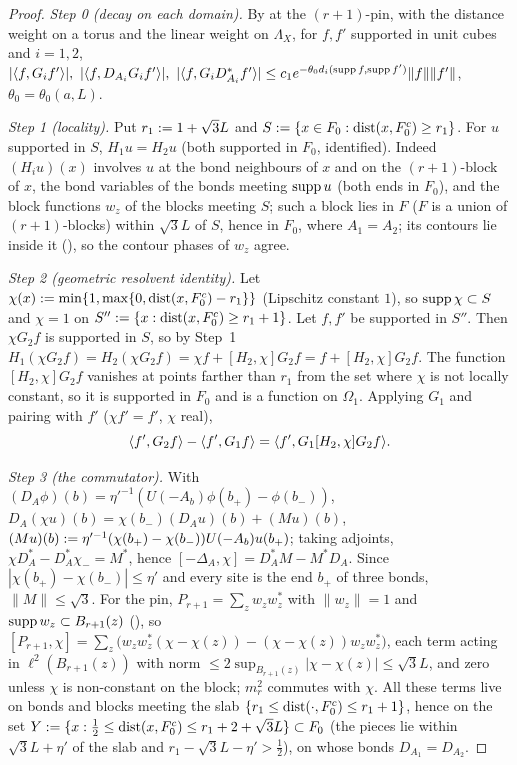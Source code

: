 \begin{proof}
\emph{Step 0 (decay on each domain).} By  at the $(r+1)$-pin, with the distance weight on a torus and the linear weight on $\Lambda_X$, for $f,f'$ supported in unit cubes and $i=1,2$,
$|\langle f,G_if'\rangle|,\ |\langle f,D_{A_i}G_if'\rangle|,\ |\langle f,G_iD_{A_i}^*f'\rangle|\le c_1e^{-\theta_0d_i(\operatorname{supp} f,\operatorname{supp} f')}\|f\|\|f'\|$, $\theta_0=\theta_0(a,L)$.

\emph{Step 1 (locality).} Put $r_1:=1+\sqrt3L$ and $S:=\{x\in F_0:\operatorname{dist}(x,F_0^c)\ge r_1\}$. For $u$ supported in $S$, $H_1u=H_2u$ (both supported in $F_0$, identified). Indeed $(H_iu)(x)$ involves $u$ at the bond neighbours of $x$ and on the $(r+1)$-block of $x$, the bond variables of the bonds meeting $\operatorname{supp} u$ (both ends in $F_0$), and the block functions $w_z$ of the blocks meeting $S$; such a block lies in $F$ ($F$ is a union of $(r+1)$-blocks) within $\sqrt3L$ of $S$, hence in $F_0$, where $A_1=A_2$; its contours lie inside it (), so the contour phases of $w_z$ agree.

\emph{Step 2 (geometric resolvent identity).} Let $\chi(x):=\min\{1,\max\{0,\operatorname{dist}(x,F_0^c)-r_1\}\}$ (Lipschitz constant $1$), so $\operatorname{supp}\chi\subset S$ and $\chi=1$ on $S'':=\{x:\operatorname{dist}(x,F_0^c)\ge r_1+1\}$. Let $f,f'$ be supported in $S''$. Then $\chi G_2f$ is supported in $S$, so by Step~1 $H_1(\chi G_2f)=H_2(\chi G_2f)=\chi f+[H_2,\chi]G_2f=f+[H_2,\chi]G_2f$. The function $[H_2,\chi]G_2f$ vanishes at points farther than $r_1$ from the set where $\chi$ is not locally constant, so it is supported in $F_0$ and is a function on $\Omega_1$. Applying $G_1$ and pairing with $f'$ ($\chi f'=f'$, $\chi$ real),
\begin{equation}\label{rot:hyb:eq:B3}
\langle f',G_2f\rangle-\langle f',G_1f\rangle=\langle f',G_1[H_2,\chi]G_2f\rangle.
\end{equation}

\emph{Step 3 (the commutator).} With $(D_A\phi)(b)=\eta'^{-1}(U(-A_b)\phi(b_+)-\phi(b_-))$, $D_A(\chi u)(b)=\chi(b_-)(D_Au)(b)+(Mu)(b)$, $(Mu)(b):=\eta'^{-1}(\chi(b_+)-\chi(b_-))U(-A_b)u(b_+)$; taking adjoints, $\chi D_A^*-D_A^*\chi_-=M^*$, hence $[-\Delta_A,\chi]=D_A^*M-M^*D_A$. Since $|\chi(b_+)-\chi(b_-)|\le\eta'$ and every site is the end $b_+$ of three bonds, $\|M\|\le\sqrt3$. For the pin, $P_{r+1}=\sum_zw_zw_z^*$ with $\|w_z\|=1$ and $\operatorname{supp} w_z\subset B_{r+1}(z)$ (), so $[P_{r+1},\chi]=\sum_z\big(w_zw_z^*(\chi-\chi(z))-(\chi-\chi(z))w_zw_z^*\big)$, each term acting in $\ell^2(B_{r+1}(z))$ with norm $\le2\sup_{B_{r+1}(z)}|\chi-\chi(z)|\le\sqrt3L$, and zero unless $\chi$ is non-constant on the block; $m_r^2$ commutes with $\chi$. All these terms live on bonds and blocks meeting the slab $\{r_1\le\operatorname{dist}(\cdot,F_0^c)\le r_1+1\}$, hence on the set $Y:=\{x:\tfrac12\le\operatorname{dist}(x,F_0^c)\le r_1+2+\sqrt3L\}\subset F_0$ (the pieces lie within $\sqrt3L+\eta'$ of the slab and $r_1-\sqrt3L-\eta'>\tfrac12$), on whose bonds $D_{A_1}=D_{A_2}$.


\end{proof}
